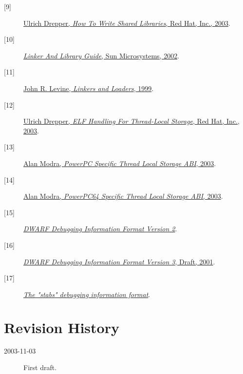 \documentclass[twoside]{article}
\begin{document}
\begin{appendix}
\begin{description}
\item[\textrm{[9]}]
\href{http://people.redhat.com/drepper/dsohowto.pdf}%
{Ulrich Drepper, {\sl How To Write Shared Libraries}, Red Hat, Inc., 2003}.

\item[\textrm{[10]}]
\href{http://docs.sun.com/db/doc/816-1386}%
{{\sl Linker And Library Guide}, Sun Microsystems, 2002}.

\item[\textrm{[11]}]
\href{http://www.gzlinux.org/docs/category/dev/c/linkerandloader.pdf}%
{John R. Levine, {\sl Linkers and Loaders}, 1999}.

\item[\textrm{[12]}]
\href{http://people.redhat.com/drepper/tls.pdf}%
{Ulrich Drepper, {\sl ELF Handling For Thread-Local Storage}, Red Hat, Inc.,
2003}.

\item[\textrm{[13]}]
\href{ftp://ftp.linuxppc64.org/pub/people/amodra/ppc32tls.txt.gz}%
{Alan Modra, {\sl PowerPC Specific Thread Local Storage ABI}, 2003}.

\item[\textrm{[14]}]
\href{ftp://ftp.linuxppc64.org/pub/people/amodra/ppc64tls.txt.gz}%
{Alan Modra, {\sl PowerPC64 Specific Thread Local Storage ABI}, 2003}.

\item[\textrm{[15]}]
\href{http://www.eagercon.com/dwarf/dwarf-2.0.0.pdf}%
{\sl DWARF Debugging Information Format Version 2}.

\item[\textrm{[16]}]
\href{http://reality.sgiweb.org/davea/dwarf3-draft8-011125.pdf}%
{{\sl DWARF Debugging Information Format Version 3}, Draft, 2001}.

\item[\textrm{[17]}]
\href{http://sources.redhat.com/cgi-bin/cvsweb.cgi/src/gdb/doc/stabs.texinfo?cvsroot=src}%
{\sl The "stabs" debugging information format}.
\end{description}


\section{Revision History}

\begin{description}
\item[2003-11-03] First draft.


\end{description}

\end{appendix}
\end{document}

